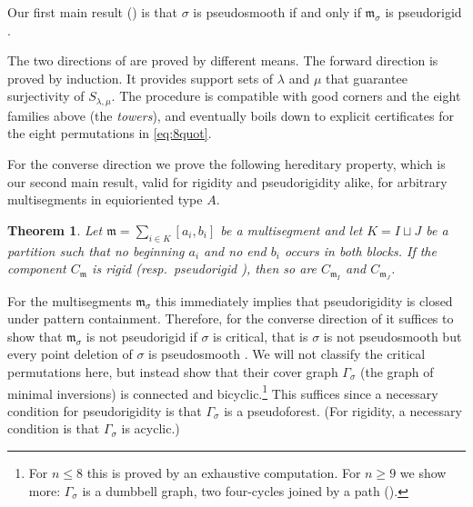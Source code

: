 \documentclass[12pt]{article}
\def\xspace{ }%
\newtheorem{theorem}{Theorem}[section]
\theoremstyle{definition}
\newcommand{\prig}{pseudorigid\xspace}
\newcommand{\prigity}{pseudorigidity\xspace}
\newcommand{\psm}{pseudosmooth\xspace}
\newcommand{\good}{good\xspace}
\newcommand{\cmp}{C}                       %
\newcommand{\mm}{\mathfrak{m}}
\newcommand{\Kk}{K}         %
\newcommand{\Sop}{S}
\newcommand{\cgr}{\Gamma}                 %
\begin{document}
Our first main result () is that $\sigma$ is \psm if and only if $\mm_\sigma$ is \prig.


The two directions of  are proved by different means.
The forward direction is proved by induction.
It provides support sets of $\lambda$ and $\mu$ that guarantee surjectivity of $\Sop_{\lambda,\mu}$.
The procedure is compatible with \good corners and the eight families above (the \emph{towers}), and eventually boils down to explicit certificates for the eight permutations in \eqref{eq:8quot}.

For the converse direction we prove the following hereditary property, which is our second main result, valid
for rigidity and \prigity alike, for arbitrary multisegments in equioriented type $A$.

\begin{theorem}\label{thm:mainB}
Let $\mm = \sum_{i \in \Kk} [a_i,b_i]$ be a multisegment and let $\Kk = I \sqcup J$ be a partition such that no beginning $a_i$ and no end
$b_i$ occurs in both blocks. If the component $\cmp_\mm$ is rigid (resp.\ \prig),
then so are $\cmp_{\mm_I}$ and $\cmp_{\mm_J}$.
\end{theorem}
For the multisegments $\mm_\sigma$ this immediately implies that \prigity is closed under pattern containment.
Therefore, for the converse direction of  it suffices to show that $\mm_\sigma$ is not \prig if $\sigma$ is critical, that is
$\sigma$ is not \psm but every point deletion of $\sigma$ is \psm.
We will not classify the critical permutations here, but instead show that their cover graph $\cgr_\sigma$ (the graph of minimal inversions)
is connected and bicyclic.\footnote{For $n\le8$ this is proved by an exhaustive computation.
For $n\ge9$ we show more: $\cgr_\sigma$ is a dumbbell graph, two four-cycles
joined by a path ().}
This suffices since a necessary condition for \prigity is that $\cgr_\sigma$ is a pseudoforest.
(For rigidity, a necessary condition is that $\cgr_\sigma$ is acyclic.)
\end{document}

